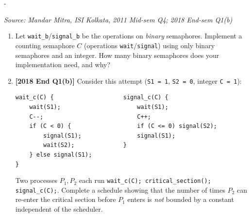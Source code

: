 \documentclass[11pt,a4paper]{article}
\makeatletter
\newcommand{\keepspace}[1]{\par\penalty-100\begingroup
  \setlength{\dimen@}{#1}\dimen@ii\pagegoal\advance\dimen@ii-\pagetotal
  \ifdim\dimen@>\dimen@ii\ifdim\dimen@ii>\z@\vfil\fi\break\fi\endgroup}
\newcounter{qn}[section]
\newenvironment{Qn}[4]{%
  \refstepcounter{qn}\keepspace{7\baselineskip}%
  \begin{tcolorbox}[qboxstyle, title={Q\thesection.\theqn\ \ [#1 \textbar\ #2]\ \ #4}]%
  {\footnotesize\color{g3}\textit{Source: #3}}\par\smallskip%
}{%
  \end{tcolorbox}%
}
\makeatother
\begin{document}
\begin{Qn}{Hard}{Lect 19}{Mandar Mitra, ISI Kolkata, 2011 Mid-sem Q4; 2018 End-sem Q1(b)}{Counting semaphore from binary, and the bounded-waiting failure}
\begin{enumerate}
  \item[(a)] Let \texttt{wait\_b}/\texttt{signal\_b} be the operations on
        \emph{binary} semaphores. Implement a counting semaphore $C$
        (operations \texttt{wait}/\texttt{signal}) using only binary
        semaphores and an integer. How many binary semaphores does your
        implementation need, and why?
  \item[(b)] \textbf{[2018 End Q1(b)]} Consider this attempt
        (\texttt{S1 = 1}, \texttt{S2 = 0}, integer \texttt{C = 1}):
\begin{lstlisting}[numbers=none]
wait_c(C) {                    signal_c(C) {
    wait(S1);                      wait(S1);
    C--;                           C++;
    if (C < 0) {                   if (C <= 0) signal(S2);
        signal(S1);                signal(S1);
        wait(S2);              }
    } else signal(S1);
}
\end{lstlisting}
        Two processes $P_1,P_2$ each run
        \texttt{wait\_c(C); critical\_section(); signal\_c(C);}.
        Complete a schedule showing that the number of times $P_2$ can
        re-enter the critical section before $P_1$ enters is
        \emph{not} bounded by a constant independent of the scheduler.
\end{enumerate}
\end{Qn}
\end{document}
